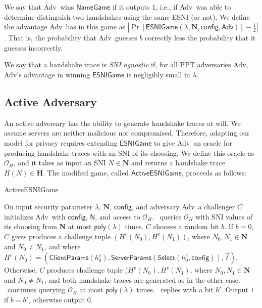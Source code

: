 \documentclass{article}
\newcommand{\adv}{{\sf Adv}}
\newcommand{\madv}{\mathsf{Adv}}
\begin{document}
We say that \adv\ wins $\mathsf{NameGame}$ if it outputs $1$, i.e., if \adv\ was able to determine distinguish 
two handshakes using the same ESNI (or not). We define the advantage \adv\ has in this game as
$|\Pr[\mathsf{ESNIGame}(\lambda, \mathbf{N}, \mathsf{config}, \madv)] - \frac{1}{2}|$. That is, 
the probability that \adv\ guesses $b$ correctly less the probability that it guesses incorrectly. 

We say that a handshake trace is \emph{SNI agnostic} if, for all PPT adversaries \adv, \adv's advantage in 
winning $\mathsf{ESNIGame}$ is negligibly small in $\lambda$. 


\subsection{Active Adversary}

An active adversary has the ability to generate handshake traces at will. We assume servers are neither malicious nor compromised. 
Therefore, adapting our model for privacy requires extending $\mathsf{ESNIGame}$ to give \adv\ an oracle for producing handshake
traces with an SNI of its choosing. We define this oracle as $\mathcal{O}_H$, and it takes as input an SNI $N \in \mathbf{N}$
and returns a handshake trace $H(N) \in \mathbf{H}$. The modified game, called $\mathsf{ActiveESNIGame}$, proceeds as follows:

\begin{algorithm}
\caption{{\sf ActiveESNIGame}} 
\label{alg:active-esnigame}
\begin{algorithmic}[1]
  \STATE On input security parameter $\lambda$, $\mathbf{N}$, $\mathsf{config}$, and adversary \adv\, a challenger $C$ initializes \adv\ with $\mathsf{config}$, $\mathsf{N}$, and access to $\mathcal{O}_H$.
  \STATE \adv\ queries $\mathcal{O}_H$ with SNI values of its choosing from $\mathbf{N}$ at most $\mathsf{poly}(\lambda)$ times.
  \STATE $C$ chooses a random bit $b$. If $b = 0$, $C$ gives produces a challenge tuple $(H^v(N_0), H^v(N_1))$, where $N_0,N_1 \in \mathbf{N}$ and $N_0 \not= N_1$, and where $H^v(N_0) = (\mathsf{ClientParams}(h^c_0), \mathsf{ServerParams}(\mathsf{Select}(h^c_0, \mathsf{config})), \vec{t})$.
  Otherwise, $C$ produces challenge tuple $(H^v(N_0), H^v(N_1)$, where $N_0,N_1 \in \mathbf{N}$ and $N_0 \not= N_1$, and both handshake traces are generated as in the other case.
  \STATE \adv\ continues querying $\mathcal{O}_H$ at most $\mathsf{poly}(\lambda)$ times.
  \STATE \adv\ replies with a bit $b'$.
  \STATE Output $1$ if $b = b'$, otherwise output $0$.
\end{algorithmic}
\end{algorithm}
\end{document}
